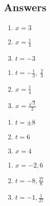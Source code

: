 \documentclass{ximera}
\begin{document}
\newpage

\subsection{Answers}

\begin{multicols}{3}
\begin{enumerate}


\item $x=3$  
\item  $x = \frac{1}{4}$
\item  $t=-3$  

\setcounter{HW}{\value{enumi}}
\end{enumerate}
\end{multicols}

\begin{multicols}{3}
\begin{enumerate}
\setcounter{enumi}{\value{HW}}


\item  $t = -\frac{1}{3}, \; \frac{2}{3}$  
\item $x = \frac{1}{4}$  
\item $x = \frac{\sqrt{3}}{2}$

\setcounter{HW}{\value{enumi}}
\end{enumerate}
\end{multicols}

\begin{multicols}{3}
\begin{enumerate}
\setcounter{enumi}{\value{HW}}


\item $t = \pm 8$
\item $t = 6$
\item  $x = 4$

\setcounter{HW}{\value{enumi}}
\end{enumerate}
\end{multicols}

\begin{multicols}{3}
\begin{enumerate}
\setcounter{enumi}{\value{HW}}
 
\item  $x=-2, 6$  
\item   $t=-8, \frac{27}{8}$
\item   $t=-1, \frac{1}{27}$   

\setcounter{HW}{\value{enumi}}
\end{enumerate}
\end{multicols}
\end{document}
